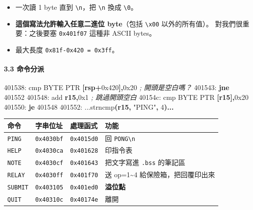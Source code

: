 \documentclass[10pt,a4paper]{article}
\newcounter{none}
\newenvironment{Shaded}{\begin{snugshade}}{\end{snugshade}}
\newcommand{\BaseNTok}[1]{\textcolor[rgb]{0.00,0.00,0.81}{#1}}
\newcommand{\BuiltInTok}[1]{#1}
\newcommand{\CommentTok}[1]{\textcolor[rgb]{0.56,0.35,0.01}{\textit{#1}}}
\newcommand{\ControlFlowTok}[1]{\textcolor[rgb]{0.13,0.29,0.53}{\textbf{#1}}}
\newcommand{\DataTypeTok}[1]{\textcolor[rgb]{0.13,0.29,0.53}{#1}}
\newcommand{\DecValTok}[1]{\textcolor[rgb]{0.00,0.00,0.81}{#1}}
\newcommand{\KeywordTok}[1]{\textcolor[rgb]{0.13,0.29,0.53}{\textbf{#1}}}
\newcommand{\NormalTok}[1]{#1}
\newcommand{\OperatorTok}[1]{\textcolor[rgb]{0.81,0.36,0.00}{\textbf{#1}}}
\newcommand{\StringTok}[1]{\textcolor[rgb]{0.31,0.60,0.02}{#1}}
\renewenvironment{Shaded}{%
  \def\FrameCommand{\fboxsep=3.2pt\colorbox{shadecolor}}%
  \MakeFramed{\advance\hsize-\width\FrameRestore\small}%
}{%
  \endMakeFramed
}
\providecommand{\tightlist}{%
  \setlength{\itemsep}{0pt}\setlength{\parskip}{0pt}}
\begin{document}
\begin{itemize}
\tightlist
\item
  一次讀 1 byte 直到 \texttt{\textbackslash{}\allowbreak{}n}，把
  \texttt{\textbackslash{}\allowbreak{}n} 換成 \texttt{\textbackslash{}\allowbreak{}0}。
\item
  \textbf{這個寫法允許輸入任意二進位 byte}（包括
  \texttt{\textbackslash{}\allowbreak{}x00} 以外的所有值）。 對我們很重要：之後要塞
  \texttt{0x401f07} 這種非 ASCII bytes。
\item
  最大長度 \texttt{0x81f-\allowbreak{}0x420\ \allowbreak{}=\ \allowbreak{}0x3ff}。
\end{itemize}

\paragraph{3.3 命令分派}\label{ux547dux4ee4ux5206ux6d3e}

\begin{Shaded}
\begin{Highlighting}[]
\NormalTok{401538:  }\BuiltInTok{cmp} \DataTypeTok{BYTE} \DataTypeTok{PTR} \OperatorTok{[}\KeywordTok{rsp}\OperatorTok{+}\BaseNTok{0x420}\OperatorTok{],}\BaseNTok{0x20}     \CommentTok{; 開頭是空白嗎？}
\NormalTok{401543:  }\ControlFlowTok{jne} \DecValTok{401552}
\NormalTok{401548:  }\BuiltInTok{add} \KeywordTok{r15}\OperatorTok{,}\BaseNTok{0x1}                       \CommentTok{; 跳過開頭空白}
\NormalTok{40154c:  }\BuiltInTok{cmp} \DataTypeTok{BYTE} \DataTypeTok{PTR} \OperatorTok{[}\KeywordTok{r15}\OperatorTok{],}\BaseNTok{0x20}
\NormalTok{401550:  }\ControlFlowTok{je}  \DecValTok{401548}
\NormalTok{401552:  ...strncmp}\OperatorTok{(}\KeywordTok{r15}\OperatorTok{,} \StringTok{"PING"}\OperatorTok{,} \DecValTok{4}\OperatorTok{)...}
\end{Highlighting}
\end{Shaded}

{\def\LTcaptype{none} %
\begin{longtable}[]{@{}llll@{}}
\toprule\noalign{}
命令 & 字串位址 & 處理函式 & 功能 \\
\midrule\noalign{}
\endhead
\bottomrule\noalign{}
\endlastfoot
\texttt{PING} & \texttt{0x4030bf} & \texttt{0x4015d0} & 回
\texttt{PONG\textbackslash{}\allowbreak{}n} \\
\texttt{HELP} & \texttt{0x4030ca} & \texttt{0x401628} & 印指令表 \\
\texttt{NOTE} & \texttt{0x4030cf} & \texttt{0x401643} & 把文字寫進
\texttt{.\allowbreak{}bss} 的筆記區 \\
\texttt{RELAY} & \texttt{0x4030ff} & \texttt{0x401f70} & 送
op=1\textasciitilde4 給保險箱，把回覆印出來 \\
\texttt{SUBMIT} & \texttt{0x403105} & \texttt{0x401ed0} &
\textbf{溢位點} \\
\texttt{QUIT} & \texttt{0x40310c} & \texttt{0x40174e} & 離開 \\
\end{longtable}
}
\end{document}
